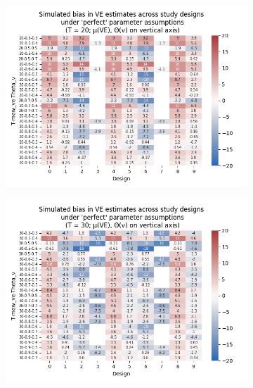 \documentclass[12pt]{article}
\begin{document}
\begin{figure}[H]
	\centering
	\caption{Simulated estimation bias under `ideal' parameter assumptions}
	\begin{subfigure}[c]{0.48\linewidth}
		\centering
		\caption{}
		\includegraphics[scale=0.55]{VEMethod_Sim1b_PureDesignBias_Heatmap20.png}
	\end{subfigure}
	\begin{subfigure}[c]{0.48\linewidth}
		\centering
		\caption{}
		\includegraphics[scale=0.55]{VEMethod_Sim1b_PureDesignBias_Heatmap30.png}
	\end{subfigure}


\end{figure}
\end{document}
